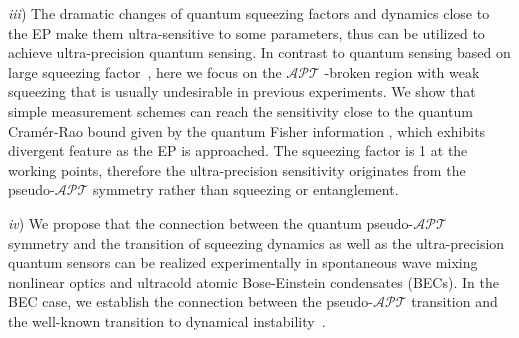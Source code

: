 \documentclass[twocolumn,prl,floatfix,citeautoscript,nofootinbib,superscriptaddress]{revtex4}
\begin{document}
\textit{iii}) The dramatic changes of quantum squeezing factors and dynamics
close to the EP make them ultra-sensitive to some parameters, thus can be
utilized to achieve ultra-precision quantum sensing. In contrast to quantum
sensing based on large squeezing factor~\cite%
{nphoton.2011.35,RevModPhys.90.035005}, here we focus on the $\mathcal{APT}$%
-broken region with weak squeezing that is usually undesirable in previous
experiments. We show that simple measurement schemes can reach the
sensitivity close to the quantum Cram\'{e}r-Rao bound given by the quantum
Fisher information \cite{nphoton.2011.35,RevModPhys.90.035005}, which
exhibits divergent feature as the EP is approached. The squeezing factor is
1 at the working points, therefore the ultra-precision sensitivity
originates from the pseudo-$\mathcal{APT}$ symmetry rather than squeezing or
entanglement.

\textit{iv}) We propose that the connection between the quantum pseudo-$%
\mathcal{APT}$ symmetry and the transition of squeezing dynamics as well as
the ultra-precision quantum sensors can be realized experimentally in
spontaneous wave mixing nonlinear optics and ultracold atomic Bose-Einstein
condensates (BECs). In the BEC case, we establish the connection between the
pseudo-$\mathcal{APT}$ transition and the well-known transition to dynamical
instability~\cite{BECbook}.
\end{document}
